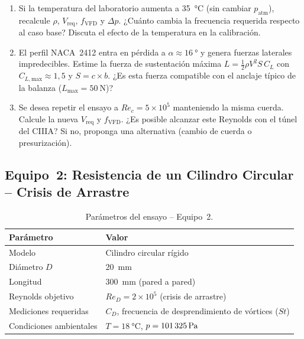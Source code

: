 \documentclass[12pt,a4paper]{article}
\begin{document}
\begin{enumerate}
	\item[\textbf{P1.1}] Si la temperatura del laboratorio aumenta a
	      \SI{35}{\degreeCelsius} (sin cambiar $p_\mathrm{atm}$), recalcule
	      $\rho$, $V_\mathrm{req}$, $f_\mathrm{VFD}$ y $\Delta p$.  ¿Cuánto cambia
	      la frecuencia requerida respecto al caso base?  Discuta el efecto de la
	      temperatura en la calibración.

	\item[\textbf{P1.2}] El perfil NACA~2412 entra en pérdida a
	      $\alpha \approx \SI{16}{\degree}$ y genera fuerzas laterales impredecibles.
	      Estime la fuerza de sustentación máxima $L = \frac{1}{2}\rho V^2 S\,C_L$
	      con $C_{L,\mathrm{max}} \approx 1{,}5$ y $S = c \times b$.  ¿Es esta
	      fuerza compatible con el anclaje típico de la balanza ($L_\mathrm{max}
		      = \SI{50}{\N}$)?

	\item[\textbf{P1.3}] Se desea repetir el ensayo a $Re_c = 5\times10^5$
	      manteniendo la misma cuerda.  Calcule la nueva $V_\mathrm{req}$ y
	      $f_\mathrm{VFD}$.  ¿Es posible alcanzar este Reynolds con el túnel del
	      CIIIA?  Si no, proponga una alternativa (cambio de cuerda o presurización).
\end{enumerate}

\subsection{Equipo~2: Resistencia de un Cilindro Circular -- Crisis de Arrastre}
\label{sec:eq2}

\begin{table}[H]
	\centering
	\caption{Parámetros del ensayo -- Equipo~2.}
	\small
	\begin{tabular}{l l}
		\toprule
		\textbf{Parámetro}      & \textbf{Valor}                              \\
		\midrule
		Modelo                  & Cilindro circular rígido                    \\
		Diámetro $D$            & \SI{20}{\mm}                                \\
		Longitud                & \SI{300}{\mm} (pared a pared)               \\
		Reynolds objetivo       & $Re_D = 2 \times 10^5$ (crisis de arrastre) \\
		Mediciones requeridas   & $C_D$, frecuencia de desprendimiento
		de vórtices ($St$)                                                    \\
		\rowcolor{aeroyellow!20}
		Condiciones ambientales & $T = \SI{18}{\degreeCelsius}$,
		$p = \SI{101\,325}{\pascal}$                                          \\
		\bottomrule
	\end{tabular}
\end{table}
\end{document}
